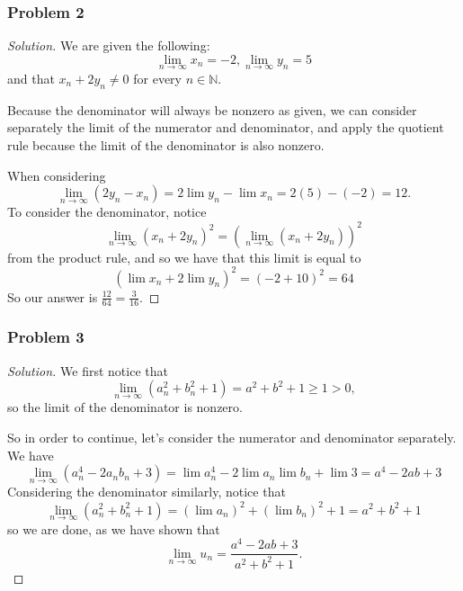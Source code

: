 \documentclass[11pt]{article}
\newcommand{\1}{\mathbf{1}}
\theoremstyle{definition}
\newenvironment{solution}{\begin{proof}[Solution]}{\end{proof}}
\begin{document}
\subsubsection*{Problem 2}
\begin{solution}
We are given the following: $$\lim_{n\rightarrow\infty} x_n = -2, \lim_{n\rightarrow\infty}
y_n = 5$$ and that $x_n + 2y_n \ne 0$ for every $n \in \mathbb{N}$.
\par Because the denominator will always be nonzero as given, we can consider separately the
limit of the numerator and denominator, and apply the quotient rule because the limit of
the denominator is also nonzero.

\par When considering $$\lim_{n\rightarrow\infty}(2y_n-x_n) = 2\lim y_n - \lim x_n = 2(5) - (-2) = 12. $$
To consider the denominator, notice $$\lim_{n\rightarrow \infty} (x_n+2y_n)^2 = \left(\lim_{n\rightarrow \infty} (x_n + 2y_n)\right)^2$$
from the product rule, and so we have that this limit is equal to 
$$\left(\lim x_n + 2\lim y_n\right)^2 = (-2 + 10)^2 = 64$$
So our answer is $\frac{12}{64} = \frac{3}{16}$.
\end{solution}

\subsubsection*{Problem 3}
\begin{solution}
    We first notice that
    $$\lim_{n\rightarrow\infty}(a_n^2+b_n^2+1)=a^2+b^2+1\ge1>0,$$
    so the limit of the denominator is nonzero.
    \par So in order to continue, let's consider the numerator and denominator
    separately.
    We have $$\lim_{n\rightarrow\infty}( a_n^4 - 2a_nb_n + 3) =
    \lim a_n^4 - 2\lim a_n \lim b_n + \lim 3 = a^4 - 2ab + 3$$
    Considering the denominator similarly, notice that 
    $$\lim_{n\rightarrow\infty} (a_n^2 + b_n^2 + 1) = (\lim a_n)^2 + (\lim b_n)^2 + 1 =a^2 + b^2 + 1$$
    so we are done, as we have shown that $$\lim_{n\rightarrow\infty} u_n =
    \frac{a^4-2ab+3}{a^2+b^2+1}.$$
\end{solution}
\end{document}
